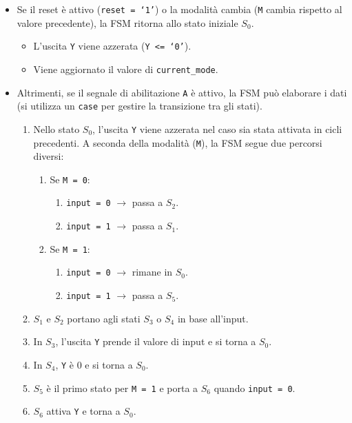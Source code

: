 \begin{itemize}
    \item Se il reset è attivo (\texttt{reset = `1'}) o la modalità cambia (\texttt{M} cambia rispetto al valore precedente), la FSM ritorna allo stato iniziale $S_0$.
    \begin{itemize}
        \item L'uscita \texttt{Y} viene azzerata (\texttt{Y <= `0'}).
        \item Viene aggiornato il valore di \texttt{current\_mode}.
    \end{itemize}
    \item Altrimenti, se il segnale di abilitazione \texttt{A} è attivo, la FSM può elaborare i dati (si utilizza un \texttt{case} per gestire la transizione tra gli stati).
    \begin{enumerate}
        \item Nello stato $S_0$, l'uscita \texttt{Y} viene azzerata nel caso sia stata attivata in cicli precedenti. A seconda della modalità (\texttt{M}), la FSM segue due percorsi diversi:
        \begin{enumerate}
            \item Se \texttt{M = 0}:
            \begin{enumerate}
                \item \texttt{input = 0} $\rightarrow$ passa a $S_2$.
                \item \texttt{input = 1} $\rightarrow$ passa a $S_1$.
            \end{enumerate}
            \item Se \texttt{M = 1}:
            \begin{enumerate}
                \item \texttt{input = 0} $\rightarrow$ rimane in $S_0$.
                \item \texttt{input = 1} $\rightarrow$ passa a $S_5$.
            \end{enumerate}
        \end{enumerate}
        \item $S_1$ e $S_2$ portano agli stati $S_3$ o $S_4$ in base all'input.
        \item In $S_3$, l'uscita \texttt{Y} prende il valore di input e si torna a $S_0$.
        \item In $S_4$, \texttt{Y} è 0 e si torna a $S_0$.
        \item $S_5$ è il primo stato per \texttt{M = 1} e porta a $S_6$ quando \texttt{input = 0}.
        \item $S_6$ attiva \texttt{Y} e torna a $S_0$.
    \end{enumerate}
\end{itemize}

